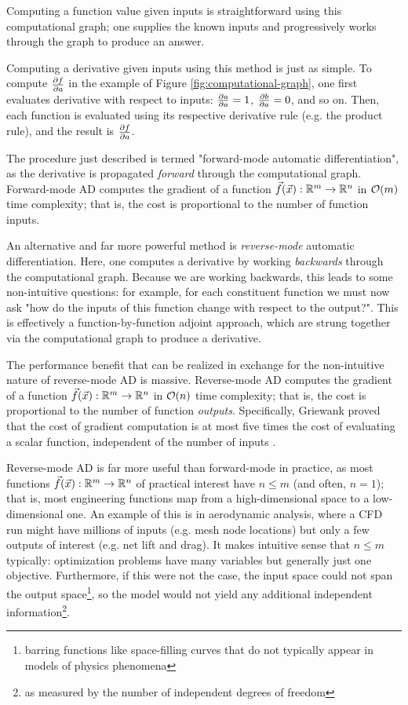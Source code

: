 Computing a function value given inputs is straightforward using this computational graph; one supplies the known inputs and progressively works through the graph to produce an answer.

Computing a derivative given inputs using this method is just as simple. To compute $\frac{\partial f}{\partial a}$ in the example of Figure \ref{fig:computational-graph}, one first evaluates derivative with respect to inputs: $\frac{\partial a}{\partial a}=1$, $\frac{\partial b}{\partial a}=0$, and so on. Then, each function is evaluated using its respective derivative rule (e.g. the product rule), and the result is $\frac{\partial f}{\partial a}$.

The procedure just described is termed "forward-mode automatic differentiation", as the derivative is propagated \textit{forward} through the computational graph. Forward-mode AD computes the gradient of a function $\vec{f}(\vec{x}): \mathbb{R}^m \to \mathbb{R}^n$ in $\mathcal{O}(m)$ time complexity; that is, the cost is proportional to the number of function inputs.

An alternative and far more powerful method is \textit{reverse-mode} automatic differentiation. Here, one computes a derivative by working \textit{backwards} through the computational graph. Because we are working backwards, this leads to some non-intuitive questions: for example, for each constituent function we must now ask "how do the inputs of this function change with respect to the output?". This is effectively a function-by-function adjoint approach, which are strung together via the computational graph to produce a derivative.

The performance benefit that can be realized in exchange for the non-intuitive nature of reverse-mode AD is massive. Reverse-mode AD computes the gradient of a function $\vec{f}(\vec{x}): \mathbb{R}^m \to \mathbb{R}^n$ in $\mathcal{O}(n)$ time complexity; that is, the cost is proportional to the number of function \textit{outputs}. Specifically, Griewank proved that the cost of gradient computation is at most five times the cost of evaluating a scalar function, independent of the number of inputs \cite{griewank1997}.

Reverse-mode AD is far more useful than forward-mode in practice, as most functions $\vec{f}(\vec{x}): \mathbb{R}^m \to \mathbb{R}^n$ of practical interest have $n \leq m$ (and often, $n=1$); that is, most engineering functions map from a high-dimensional space to a low-dimensional one. An example of this is in aerodynamic analysis, where a CFD run might have millions of inputs (e.g. mesh node locations) but only a few outputs of interest (e.g. net lift and drag). It makes intuitive sense that $n \leq m$ typically: optimization problems have many variables but generally just one objective. Furthermore, if this were not the case, the input space could not span the output space\footnote{barring functions like space-filling curves that do not typically appear in models of physics phenomena}, so the model would not yield any additional independent information\footnote{as measured by the number of independent degrees of freedom}.


